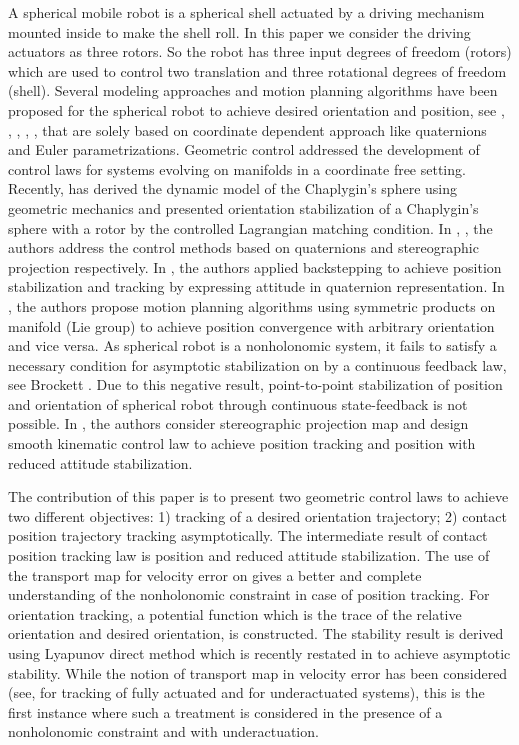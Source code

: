\documentclass{ifacconf}
\begin{document}
A spherical mobile robot is a spherical shell actuated by a driving mechanism mounted inside to make the shell roll. In this paper we consider the driving actuators as three rotors. So the robot has three input degrees of freedom (rotors) which are used to control two translation and three rotational degrees of freedom (shell). Several modeling approaches and motion planning algorithms have been proposed for the spherical robot to achieve desired orientation and position,
 see \citep{joshi_banavar}, \citep{reg_n_chaotic_2013}, \citep{mukherjee1999}, \citep{bicchi1997}, \citep{Zhan_2008}, that are solely based on coordinate dependent approach like quaternions and Euler parametrizations. Geometric control addressed the development of control laws for systems evolving on manifolds in a coordinate free setting. Recently, \cite{schneider} has derived the dynamic model of the  Chaplygin's sphere using geometric mechanics and presented  orientation stabilization of a Chaplygin's sphere with a rotor by the controlled Lagrangian matching condition. In \citep{karimpur_2012}, \citep{muralidharan_mahindrakar}, the authors address the control methods based on quaternions and stereographic projection respectively. In \cite{karimpur_2012}, the authors applied backstepping to achieve position stabilization and tracking by expressing attitude in quaternion representation. In \citep{shen2008}, the authors propose motion planning algorithms using symmetric products on manifold (Lie group) to achieve position convergence with arbitrary orientation and vice versa. As spherical robot is a nonholonomic system, it fails to satisfy a necessary condition for asymptotic stabilization on  by a continuous feedback law, see Brockett \citep{brockett}. Due to this negative result, point-to-point stabilization of position and orientation of spherical robot through continuous state-feedback is not possible. In \citep{muralidharan_mahindrakar}, the authors consider stereographic projection map and design smooth kinematic control law to achieve position tracking and position with reduced attitude stabilization. 

The contribution of this paper is to present two geometric control laws to achieve two different objectives: 1) tracking of a desired orientation trajectory; 2) contact position trajectory tracking asymptotically. The intermediate result of contact position tracking law is position and reduced attitude stabilization. The use of the transport map for velocity error on  gives a better and complete understanding of the nonholonomic constraint in case of position tracking. For orientation tracking, a potential function which is the trace of the relative orientation and desired orientation, is constructed. The stability result is derived using Lyapunov direct method \citep{nijmeijer} which is recently restated in \citep{bullo_stability} to achieve asymptotic stability. While the notion of transport map in velocity error has been considered (see, \citep{book_bullo} for tracking of fully actuated and \citep{taeyoung_lee} for underactuated systems), this is the first instance where such a treatment is considered in the presence of a nonholonomic constraint and with underactuation. 
\end{document}
